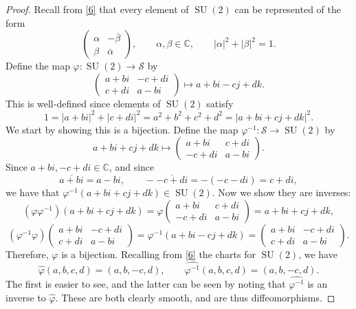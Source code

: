\documentclass[11pt, letterpaper]{article}
\theoremstyle{plain}
\begin{document}
\begin{proof}
	Recall from \cref{6} that every element of $\operatorname{SU} (2)$ can be represented of the form
	\[
		\begin{pmatrix}
		\alpha  & - \overline{\beta }  \\
		\beta  & \overline{\alpha } 
		\end{pmatrix},\qquad \alpha ,\beta \in\mathbb{C} ,\qquad \left| \alpha  \right|^2 +\left| \beta  \right|^2 =1
	.\]
	Define the map $\varphi : \operatorname{SU} (2) \to \mathcal{S} $ by
	\[
		\begin{pmatrix}
		a+bi & -c+di \\
		c+di & a-bi
		\end{pmatrix}\mapsto a+bi-cj+dk
	.\]
	This is well-defined since elements of $\operatorname{SU} (2)$ satisfy
	\[
		1=\left| a+bi \right| ^2+\left| c+di \right| ^2=a^2+b^2+c^2+d^2=\left| a+bi+cj+dk \right| ^2
	.\]
	We start by showing this is a bijection. Define the map $\varphi ^{-1} : \mathcal{S}  \to \operatorname{SU} (2)$ by
	\[
		a+bi+cj+dk\mapsto \begin{pmatrix}
		a+bi & c+di \\
		-c+di & a-bi
		\end{pmatrix}
	.\]
	Since $a+bi,-c+di\in\mathbb{C} $, and since
	\[
		\overline{a+bi} =a-bi,\qquad -\overline{-c+di} =-(-c-di)=c+di,
	\]
	we have that $\varphi ^{-1} (a+bi+cj+dk)\in \operatorname{SU} (2)$. Now we show they are inverses:
	\[
		(\varphi \varphi ^{-1} )(a+bi+cj+dk)=\varphi \begin{pmatrix}
		a+bi & c+di \\
		-c+di & a-bi
		\end{pmatrix}=a+bi+cj+dk,
	\]
	\[
		(\varphi ^{-1} \varphi )\begin{pmatrix}
		a+bi & -c+di \\
		c+di & a-bi
		\end{pmatrix}=\varphi ^{-1} (a+bi-cj+dk)=\begin{pmatrix}
		a+bi & -c+di \\
		c+di & a-bi
		\end{pmatrix}
	.\]
	Therefore, $\varphi $ is a bijection. Recalling from \cref{6} the charts for $\operatorname{SU} (2)$, we have
	\[
		\hat{\varphi }(a,b,c,d)=(a,b,-c,d),\qquad \widehat{\varphi ^{-1} }(a,b,c,d)=(a,b,-c,d)
	.\]
	The first is easier to see, and the latter can be seen by noting that $\widehat{\varphi ^{-1} }$ is an inverse to $\hat{\varphi }$. These are both clearly smooth, and are thus diffeomorphisms.
\end{proof}
\end{document}
